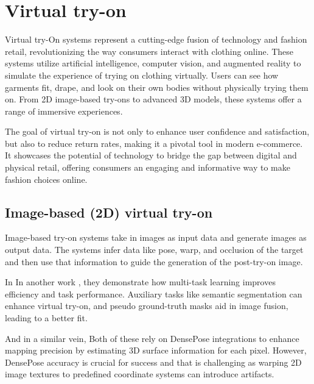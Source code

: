 \section{\textbf{Virtual try-on}} \label{section:vton}
	Virtual try-On systems represent a cutting-edge fusion of technology and fashion retail, revolutionizing the way consumers interact with clothing online. These systems utilize artificial intelligence, computer vision, and augmented reality to simulate the experience of trying on clothing virtually. Users can see how garments fit, drape, and look on their own bodies without physically trying them on. From 2D image-based try-ons to advanced 3D models, these systems offer a range of immersive experiences.
	
	The goal of virtual try-on is not only to enhance user confidence and satisfaction, but also to reduce return rates, making it a pivotal tool in modern e-commerce. It showcases the potential of technology to bridge the gap between digital and physical retail, offering consumers an engaging and informative way to make fashion choices online.

	\subsection{\textbf{Image-based (2D) virtual try-on}}
		Image-based try-on systems take in images as input data and generate images as output data. The systems infer data like pose, warp, and occlusion of the target and then use that information to guide the generation of the post-try-on image.

		In \citeyear{DBLP:conf/iccvw/AyushJCHK19}  In another work \cite{DBLP:conf/iccvw/AyushJCK19}, they demonstrate how multi-task learning improves efficiency and task performance. Auxiliary tasks like semantic segmentation can enhance virtual try-on, and pseudo ground-truth masks aid in image fusion, leading to a better fit.
		
		 And in a similar vein,  Both of these rely on DensePose integrations to enhance mapping precision by estimating 3D surface information for each pixel. However, DensePose accuracy is crucial for success and that is challenging as warping 2D image textures to predefined coordinate systems can introduce artifacts.

